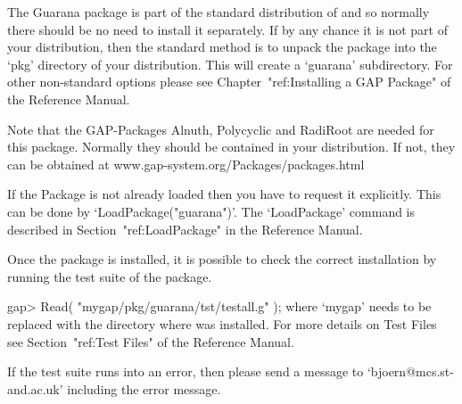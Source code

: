 
\null

The Guarana package is part of the standard distribution of {\GAP} and
so normally there should be no need to install it separately.
If by any chance it is not part of your {\GAP} distribution, then 
the standard method is to unpack	 the package into the `pkg'
directory  of your {\GAP} distribution.  This will create a `guarana'
subdirectory. 
For other non-standard options please see  Chapter~"ref:Installing a
GAP Package" of the {\GAP} Reference Manual.

Note that the GAP-Packages Alnuth, Polycyclic and RadiRoot 
are needed for this package.
Normally they should be contained in your distribution. If not, 
they can be obtained at
\begintt
               www.gap-system.org/Packages/packages.html             

\endtt





\null

If the {\Guarana} Package is not already loaded 
then you have to request it explicitly. 
This  can be 
done by `LoadPackage("guarana")'.
The `LoadPackage' command is described in Section~"ref:LoadPackage"
in the {\GAP} Reference Manual.


    Once the package is installed, it is possible to check the correct
    installation by running the test suite of the package.

\beginexample
    gap> Read( "mygap/pkg/guarana/tst/testall.g" );
\endexample
    where `mygap' needs to be replaced with the directory where {\GAP}
    was installed. For more details on  Test Files see 
    Section~"ref:Test Files" of the 
    {\GAP} Reference Manual.

    If the test suite runs into an error, 
    then please send a message
    to `bjoern@mcs.st-and.ac.uk' including the error message.




